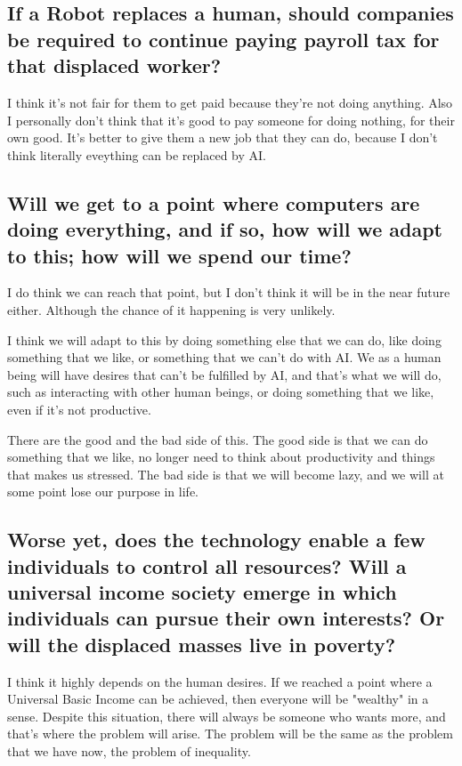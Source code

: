 \documentclass[12pt,titlepage]{article}
\begin{document}
\subsection{If a Robot replaces a human, should companies be required to continue paying payroll tax for that displaced worker?}
I think it's not fair for them to get paid because they're not doing anything. Also I personally don't think that it's
good to pay someone for doing nothing, for their own good. It's better to give them a new job that they can do, because I don't think
literally eveything can be replaced by AI.

\subsection{Will we get to a point where computers are doing everything, and if so, how will we adapt to this; how will we spend our time?}
I do think we can reach that point, but I don't think it will be in the near future either. Although the chance of it happening is very unlikely.

I think we will adapt to this by doing something else that we can do, like doing something that we like, or something that we can't do with AI.
We as a human being will have desires that can't be fulfilled by AI, and that's what we will do, such as interacting with
other human beings, or doing something that we like, even if it's not productive.

There are the good and the bad side of this. The good side is that we can do something that we like, no longer need to think about productivity and things that makes us stressed.
The bad side is that we will become lazy, and we will at some point lose our purpose in life. 

\subsection{Worse yet, does the technology enable a few individuals to control all resources? Will a universal income society emerge in which individuals can pursue their own interests? Or will the displaced masses live in poverty?}
I think it highly depends on the human desires. If we reached a point where a Universal Basic Income can be achieved, then everyone will be "wealthy" in a sense.
Despite this situation, there will always be someone who wants more, and that's where the problem will arise. The problem will be the same as the problem that we have now,
the problem of inequality.
\end{document}

